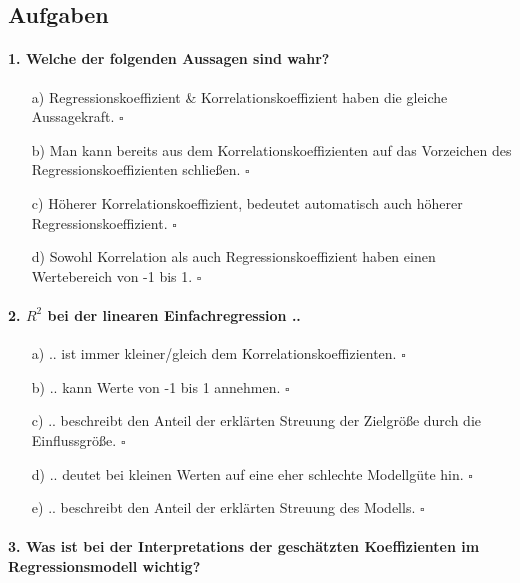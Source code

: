 \documentclass[a4paper]{article}
\begin{document}
\clearpage

\subsection{Aufgaben}

\paragraph{1. Welche der folgenden Aussagen sind wahr?}

\begin{itemize}
    \item[a)] Regressionskoeffizient \& Korrelationskoeffizient haben die gleiche Aussagekraft. \hfill $\square$
    \item[b)] Man kann bereits aus dem Korrelationskoeffizienten auf das Vorzeichen des\\Regressionskoeffizienten schließen. \hfill $\square$
    \item[c)] Höherer Korrelationskoeffizient, bedeutet automatisch auch höherer\\Regressionskoeffizient. \hfill $\square$
    \item[d)] Sowohl Korrelation als auch Regressionskoeffizient haben einen Wertebereich von -1 bis 1. \hfill $\square$
\end{itemize}

\paragraph{2. $R^2$ bei der linearen Einfachregression ..}

\begin{itemize}
    \item[a)] .. ist immer kleiner/gleich dem Korrelationskoeffizienten. \hfill $\square$
    \item[b)] .. kann Werte von -1 bis 1 annehmen. \hfill $\square$
    \item[c)] .. beschreibt den Anteil der erklärten Streuung der Zielgröße durch die Einflussgröße. \hfill $\square$
    \item[d)] .. deutet bei kleinen Werten auf eine eher schlechte Modellgüte hin. \hfill $\square$
    \item[e)] .. beschreibt den Anteil der erklärten Streuung des Modells. \hfill $\square$
\end{itemize}

\paragraph{3. Was ist bei der Interpretations der geschätzten Koeffizienten im Regressionsmodell wichtig?}
\end{document}

